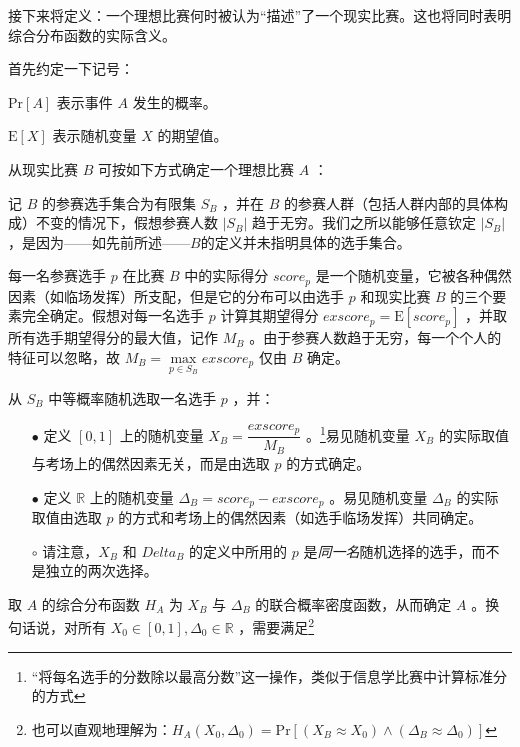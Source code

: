             接下来将定义：一个理想比赛何时被认为“描述”了一个现实比赛。这也将同时表明综合分布函数的实际含义。
            
            \vspace{1.5ex}

            首先约定一下记号：

            \begin{asparaitem}
                \item $\mathrm{Pr}\left[A\right]$ 表示事件 $A$ 发生的概率。
                \item $\mathrm{E}\left[X\right]$ 表示随机变量 $X$ 的期望值。
            \end{asparaitem}

            \begin{definition}
                从现实比赛 $B$ 可按如下方式确定一个理想比赛 $A$ ：

                \begin{asparaenum}[\bfseries{步骤} 1.]
                    \item 记 $B$ 的参赛选手集合为有限集 $S_B$ ，并在 $B$ 的参赛人群（包括人群内部的具体构成）不变的情况下，假想参赛人数 $\left|S_B\right|$ 趋于无穷。我们之所以能够任意钦定 $\left|S_B\right|$ ，是因为——如先前所述——$B$的定义并未指明具体的选手集合。
                    \item 每一名参赛选手 $p$ 在比赛 $B$ 中的实际得分 $\textit{score}_p$ 是一个随机变量，它被各种偶然因素（如临场发挥）所支配，但是它的分布可以由选手 $p$ 和现实比赛 $B$ 的三个要素完全确定。假想对每一名选手 $p$ 计算其期望得分 $\textit{exscore}_p=\mathrm{E}\left[\textit{score}_p\right]$ ，并取所有选手期望得分的最大值，记作 $M_B$ 。由于参赛人数趋于无穷，每一个个人的特征可以忽略，故 $M_B=\max\limits_{p\in S_B} \textit{exscore}_p$ 仅由 $B$ 确定。
                    \item 从 $S_B$ 中等概率随机选取一名选手 $p$ ，并：
                    \begin{itemize}[leftmargin=4em]
                        \item [$\bullet$] 定义 $[0,1]$ 上的随机变量 $X_B=\dfrac{\textit{exscore}_p}{M_B}$ 。\footnote{“将每名选手的分数除以最高分数”这一操作，类似于信息学比赛中计算标准分的方式}易见随机变量 $X_B$ 的实际取值与考场上的偶然因素无关，而是由选取 $p$ 的方式确定。
                        \item [$\bullet$] 定义 $\mathbb{R}$ 上的随机变量 $\Delta_B=\textit{score}_p-\textit{exscore}_p$ 。易见随机变量 $\Delta_B$ 的实际取值由选取 $p$ 的方式和考场上的偶然因素（如选手临场发挥）共同确定。
                        \item [$\circ$] 请注意，$X_B$ 和 $Delta_B$ 的定义中所用的 $p$ 是\emph{同一名}随机选择的选手，而不是独立的两次选择。
                    \end{itemize}
                    \item 取 $A$ 的综合分布函数 $H_A$ 为 $X_B$ 与 $\Delta_B$ 的联合概率密度函数，从而确定 $A$ 。换句话说，对所有 $X_0\in[0,1],\Delta_0\in\mathbb{R}$ ，需要满足\footnote{也可以直观地理解为：$H_A(X_0,\Delta_0)=\mathrm{Pr}\left[\left(X_B\approx X_0\right)\land\left(\Delta_B\approx\Delta_0\right)\right]$}
                    

\end{asparaenum}
\end{definition}

